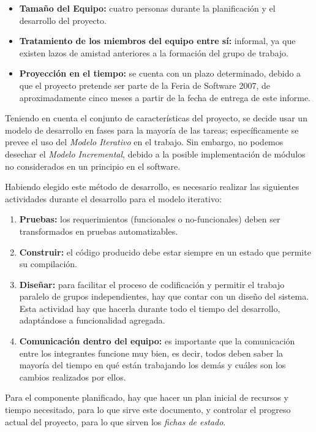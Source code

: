 \documentclass[letterpaper,titlepage,spanish,10pt]{article}
\begin{document}
\begin{itemize}
\item \textbf{Tama\~no del Equipo:} cuatro personas durante la planificaci\'on y el 
  desarrollo del proyecto.
\item \textbf{Tratamiento de los miembros del equipo entre s\'i:} informal, ya
  que existen lazos de amistad anteriores a la formaci\'on del grupo de trabajo.
\item \textbf{Proyecci\'on en el tiempo:} se cuenta con un plazo determinado,
  debido a que el proyecto pretende ser parte de la Feria de Software 2007, 
  de aproximadamente cinco meses a partir de la fecha de entrega de este informe.
\end{itemize}


Teniendo en cuenta el conjunto de caracter\'isticas del proyecto, se
decide usar un modelo de desarrollo en fases para la
mayor\'ia de las tareas; espec\'ificamente se prevee el uso del \emph{Modelo
Iterativo} en el trabajo. Sin embargo, no podemos desechar el \emph{Modelo
Incremental}, debido a la posible implementaci\'on de m\'odulos no considerados en un
principio en el software.

Habiendo elegido este m\'etodo de desarrollo, es necesario realizar las
siguientes actividades durante el desarrollo para el modelo iterativo:

\begin{enumerate}
\item \textbf{Pruebas:} los requerimientos (funcionales o no-funcionales) deben
  ser transformados en pruebas automatizables.
\item \textbf{Construir:} el c\'odigo producido debe estar siempre en un
  estado que permite su compilaci\'on.
\item \textbf{Dise\~nar:} para facilitar el proceso de codificaci\'on y permitir el
  trabajo paralelo de grupos independientes, hay que contar con un
  dise\~no del sistema.
  Esta actividad hay que hacerla durante todo el tiempo del desarrollo,
  adapt\'andose a funcionalidad agregada.
\item \textbf{Comunicaci\'on dentro del equipo:} es importante
  que la comunicaci\'on entre los integrantes funcione
  muy bien, es decir, todos deben saber la mayor\'ia del tiempo en qu\'e
  est\'an trabajando los dem\'as y cu\'ales son los cambios realizados por
  ellos.
\end{enumerate}

Para el componente planificado, hay que hacer un plan inicial de
recursos y tiempo necesitado, para lo que sirve este documento, y
controlar el progreso actual del proyecto, para lo que sirven los
\emph{fichas de estado}.
\end{document}
